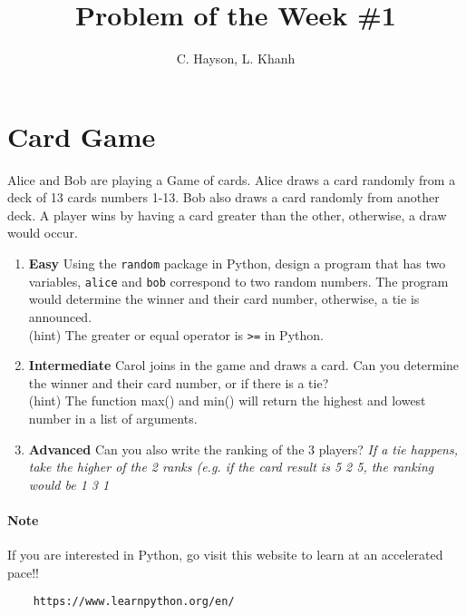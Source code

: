 \documentclass[12pt]{article}
\title{\textbf{Problem of the Week \#1}}
\author{C. Hayson, L. Khanh}
\begin{document}
\maketitle
\section*{Card Game}
Alice and Bob are playing a Game of cards. Alice draws a card randomly from a deck of 13 cards numbers 1-13. Bob also draws a card randomly from another deck. A player wins by having a card greater than the other, otherwise, a draw would occur. \\
\begin{enumerate}[label=]
    \item \textbf{Easy} Using the \verb|random| package in Python, design a program that has two variables, \verb|alice| and  \verb|bob| correspond to two random numbers. The program would determine the winner and their card number, otherwise, a tie is announced.\\
    (hint) The greater or equal operator is \verb|>=| in Python.\\
    \item \textbf{Intermediate} Carol joins in the game and draws a card. Can you determine the winner and their card number, or if there is a tie? \\
    (hint) The function max() and min() will return the highest and lowest number in a list of arguments.
    \item \textbf{Advanced} Can you also write the ranking of the 3 players? \textit{If a tie happens, take the higher of the 2 ranks (e.g. if the card result is 5 2 5, the ranking would be 1 3 1}
\end{enumerate}

\paragraph{Note} If you are interested in Python, go visit this website to learn at an accelerated pace!!
\begin{verbatim}
    https://www.learnpython.org/en/
\end{verbatim}
\end{document}
